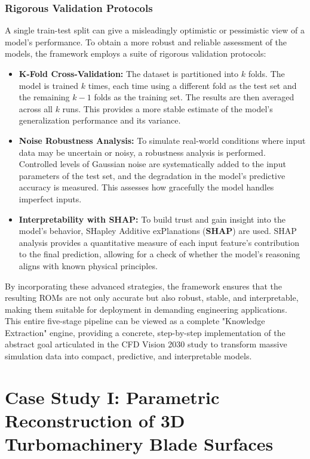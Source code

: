 \documentclass[dsc, EN]{ufabcFHZh}
\begin{document}
\subsection{Rigorous Validation Protocols}

A single train-test split can give a misleadingly optimistic or pessimistic view of a model's performance. To obtain a more robust and reliable assessment of the models, the framework employs a suite of rigorous validation protocols:


\begin{itemize}
    \item \textbf{K-Fold Cross-Validation:} The dataset is partitioned into $k$ folds. The model is trained $k$ times, each time using a different fold as the test set and the remaining $k-1$ folds as the training set. The results are then averaged across all $k$ runs. This provides a more stable estimate of the model's generalization performance and its variance.

    \item \textbf{Noise Robustness Analysis:} To simulate real-world conditions where input data may be uncertain or noisy, a robustness analysis is performed. Controlled levels of Gaussian noise are systematically added to the input parameters of the test set, and the degradation in the model's predictive accuracy is measured. This assesses how gracefully the model handles imperfect inputs.

    \item \textbf{Interpretability with SHAP:} To build trust and gain insight into the model's behavior, SHapley Additive exPlanations (\textbf{SHAP}) are used. SHAP analysis provides a quantitative measure of each input feature's contribution to the final prediction, allowing for a check of whether the model's reasoning aligns with known physical principles.
\end{itemize}


By incorporating these advanced strategies, the framework ensures that the resulting ROMs are not only accurate but also robust, stable, and interpretable, making them suitable for deployment in demanding engineering applications. This entire five-stage pipeline can be viewed as a complete "Knowledge Extraction" engine, providing a concrete, step-by-step implementation of the abstract goal articulated in the CFD Vision 2030 study to transform massive simulation data into compact, predictive, and interpretable models.   


\chapter{Case Study I: Parametric Reconstruction of 3D Turbomachinery Blade Surfaces}
\end{document}
